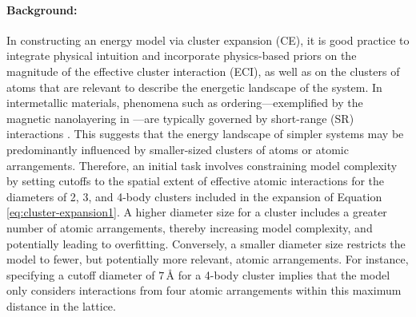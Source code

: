 \documentclass{article}
\let\citep\parencite   %
\begin{document}
\paragraph{Background:}
In constructing an energy model via cluster expansion (CE), it is good practice to integrate physical intuition and incorporate physics-based priors on the magnitude of the effective cluster interaction (ECI), as well as on the clusters of atoms that are relevant to describe the energetic landscape of the system. In intermetallic materials, phenomena such as ordering---exemplified by the magnetic nanolayering in ---are typically governed by short-range (SR) interactions \citep{ShortRange}. This suggests that the energy landscape of simpler systems may be predominantly influenced by smaller-sized clusters of atoms or atomic arrangements. Therefore, an initial task involves constraining model complexity by setting cutoffs to the spatial extent of effective atomic interactions for the diameters of 2, 3, and 4-body clusters included in the expansion of Equation \ref{eq:cluster-expansion1}. A higher diameter size for a cluster includes a greater number of atomic arrangements, thereby increasing model complexity, and potentially leading to overfitting. Conversely, a smaller diameter size restricts the model to fewer, but potentially more relevant, atomic arrangements. For instance, specifying a cutoff diameter of $7 \, \text{\AA}$ for a 4-body cluster implies that the model only considers interactions from four atomic arrangements within this maximum distance in the lattice.
\end{document}
